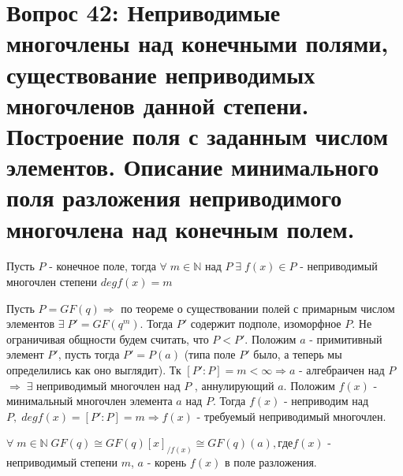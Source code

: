 \section{Вопрос 42: Неприводимые многочлены над конечными полями, существование неприводимых многочленов данной степени. Построение поля с заданным числом элементов. Описание минимального поля разложения неприводимого многочлена над конечным полем.
}

\begin{proofs}
	Пусть $P$ - конечное поле, тогда $\forall\; m \in \mathbb{N}$ над $P\; \exists\; f(x) \in P$ - неприводимый многочлен степени $degf(x) = m$
  \begin{dokvo}
    Пусть $P = GF(q) \Rightarrow$ по теореме о существовании полей с примарным числом элементов $\exists\; P' = GF(q^m)$.
    Тогда $P'$ содержит подполе, изоморфное $P$. Не ограничивая общности будем считать, что $P < P'$.
    Положим  $a$ - примитивный элемент $P'$, пусть тогда $P' = P(a)$ (типа поле $P'$ было, а теперь мы определились как оно выглядит). Тк $[P':P] = m < \infty \Rightarrow a$ -  алгебраичен над $P$
    $\Rightarrow\; \exists$ неприводимый многочлен над $P$ , аннулирующий $a$. Положим $f(x)$ - минимальный многочлен элемента $a$ над $P$.
    Тогда $f(x)$ - неприводим над $P,\; degf(x) = [P':P] = m \Rightarrow f(x)$ - требуемый неприводимый многочлен. 
	\end{dokvo}
\end{proofs}

\begin{sledsv}[]
  $\forall\; m \in \mathbb{N}\; GF(q) \cong GF(q)[x]_{/f(x)} \cong GF(q)(a), где f(x)$ - неприводимый степени $m$, $a$ - корень $f(x)$ в поле разложения.
\end{sledsv}


